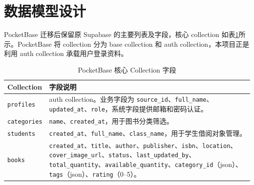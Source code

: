 \section{数据模型设计}

PocketBase 迁移后保留原 Supabase 的主要列表及字段，核心 collection 如表\ref{tab:data-model}所示。PocketBase 将 collection 分为 base collection 和 auth collection，本项目正是利用 auth collection 承载用户登录资料\cite{pocketbase_collections,pocketbase_authentication}。

\begin{table}[!htbp]
    \centering
    \caption{PocketBase 核心 Collection 字段}
    \label{tab:data-model}
    \begin{tabularx}{0.95\textwidth}{l>{\RaggedRight\arraybackslash}X}
        \toprule
        \textbf{Collection}      & \textbf{字段说明}                                                                                                                                                                                                                                                                                             \\
        \midrule
        \texttt{profiles}        & auth collection。业务字段为 \texttt{source\_id}、\texttt{full\_name}、\texttt{updated\_at}、\texttt{role}，系统字段提供邮箱和密码认证。                                                                                                                                                                                           \\
        \texttt{categories}      & \texttt{name}、\texttt{created\_at}，用于图书分类筛选。                                                                                                                                                                                                                                                              \\
        \texttt{students}        & \texttt{created\_at}、\texttt{full\_name}、\texttt{class\_name}，用于学生借阅对象管理。                                                                                                                                                                                                                                 \\
        \texttt{books}           & \texttt{created\_at}、\texttt{title}、\texttt{author}、\texttt{publisher}、\texttt{isbn}、\texttt{location}、\texttt{cover\_image\_url}、\texttt{status}、\texttt{last\_updated\_by}、\texttt{total\_quantity}、\texttt{available\_quantity}、\texttt{category\_id}（json）、\texttt{tags}（json）、\texttt{rating}（0--5）。 \\

\end{tabularx}
\end{table}
